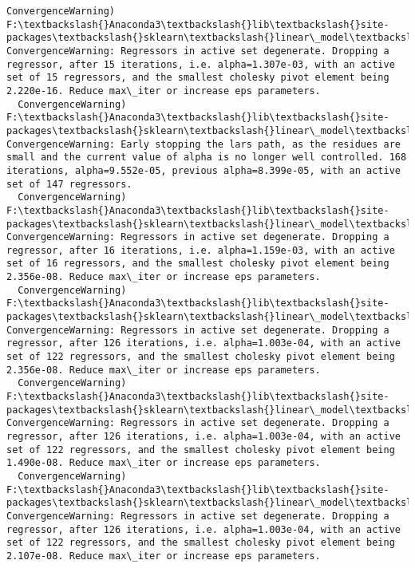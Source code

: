 \documentclass[11pt]{article}
\begin{document}
\begin{Verbatim}[commandchars=\\\{\}]
  ConvergenceWarning)
F:\textbackslash{}Anaconda3\textbackslash{}lib\textbackslash{}site-packages\textbackslash{}sklearn\textbackslash{}linear\_model\textbackslash{}least\_angle.py:313: ConvergenceWarning: Regressors in active set degenerate. Dropping a regressor, after 15 iterations, i.e. alpha=1.307e-03, with an active set of 15 regressors, and the smallest cholesky pivot element being 2.220e-16. Reduce max\_iter or increase eps parameters.
  ConvergenceWarning)
F:\textbackslash{}Anaconda3\textbackslash{}lib\textbackslash{}site-packages\textbackslash{}sklearn\textbackslash{}linear\_model\textbackslash{}least\_angle.py:339: ConvergenceWarning: Early stopping the lars path, as the residues are small and the current value of alpha is no longer well controlled. 168 iterations, alpha=9.552e-05, previous alpha=8.399e-05, with an active set of 147 regressors.
  ConvergenceWarning)
F:\textbackslash{}Anaconda3\textbackslash{}lib\textbackslash{}site-packages\textbackslash{}sklearn\textbackslash{}linear\_model\textbackslash{}least\_angle.py:313: ConvergenceWarning: Regressors in active set degenerate. Dropping a regressor, after 16 iterations, i.e. alpha=1.159e-03, with an active set of 16 regressors, and the smallest cholesky pivot element being 2.356e-08. Reduce max\_iter or increase eps parameters.
  ConvergenceWarning)
F:\textbackslash{}Anaconda3\textbackslash{}lib\textbackslash{}site-packages\textbackslash{}sklearn\textbackslash{}linear\_model\textbackslash{}least\_angle.py:313: ConvergenceWarning: Regressors in active set degenerate. Dropping a regressor, after 126 iterations, i.e. alpha=1.003e-04, with an active set of 122 regressors, and the smallest cholesky pivot element being 2.356e-08. Reduce max\_iter or increase eps parameters.
  ConvergenceWarning)
F:\textbackslash{}Anaconda3\textbackslash{}lib\textbackslash{}site-packages\textbackslash{}sklearn\textbackslash{}linear\_model\textbackslash{}least\_angle.py:313: ConvergenceWarning: Regressors in active set degenerate. Dropping a regressor, after 126 iterations, i.e. alpha=1.003e-04, with an active set of 122 regressors, and the smallest cholesky pivot element being 1.490e-08. Reduce max\_iter or increase eps parameters.
  ConvergenceWarning)
F:\textbackslash{}Anaconda3\textbackslash{}lib\textbackslash{}site-packages\textbackslash{}sklearn\textbackslash{}linear\_model\textbackslash{}least\_angle.py:313: ConvergenceWarning: Regressors in active set degenerate. Dropping a regressor, after 126 iterations, i.e. alpha=1.003e-04, with an active set of 122 regressors, and the smallest cholesky pivot element being 2.107e-08. Reduce max\_iter or increase eps parameters.

\end{Verbatim}
\end{document}
